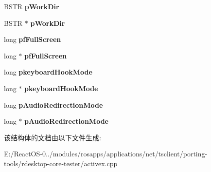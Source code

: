 \begin{DoxyCompactItemize}
B\+S\+TR {\bfseries p\+Work\+Dir}
\item 
\mbox{\label{struct_m_s_t_s_c_lib_1_1_i_ms_rdp_client_secured_settings_vtbl_ae09b5c20dd21516a9fbf886ba231ed50}} 
B\+S\+TR $\ast$ {\bfseries p\+Work\+Dir}
\item 
\mbox{\label{struct_m_s_t_s_c_lib_1_1_i_ms_rdp_client_secured_settings_vtbl_a875fca90233c7d3b97001a5804d6fe9b}} 
long {\bfseries pf\+Full\+Screen}
\item 
\mbox{\label{struct_m_s_t_s_c_lib_1_1_i_ms_rdp_client_secured_settings_vtbl_a0599ee772d402712c43a976e7da809c7}} 
long $\ast$ {\bfseries pf\+Full\+Screen}
\item 
\mbox{\label{struct_m_s_t_s_c_lib_1_1_i_ms_rdp_client_secured_settings_vtbl_adb580697c6f95c3f2e6553df38c15986}} 
long {\bfseries pkeyboard\+Hook\+Mode}
\item 
\mbox{\label{struct_m_s_t_s_c_lib_1_1_i_ms_rdp_client_secured_settings_vtbl_a658d7f924258e9995d198084f8a2273a}} 
long $\ast$ {\bfseries pkeyboard\+Hook\+Mode}
\item 
\mbox{\label{struct_m_s_t_s_c_lib_1_1_i_ms_rdp_client_secured_settings_vtbl_adbdd4a2d39e3a0d1a30f077182a38a7f}} 
long {\bfseries p\+Audio\+Redirection\+Mode}
\item 
\mbox{\label{struct_m_s_t_s_c_lib_1_1_i_ms_rdp_client_secured_settings_vtbl_a94e7f2da316c5e6f85c83d6947a24f04}} 
long $\ast$ {\bfseries p\+Audio\+Redirection\+Mode}
\end{DoxyCompactItemize}


该结构体的文档由以下文件生成\+:\begin{DoxyCompactItemize}
\item 
E\+:/\+React\+O\+S-\/0../modules/rosapps/applications/net/tsclient/porting-\/tools/rdesktop-\/core-\/tester/activex.\+cpp\end{DoxyCompactItemize}
